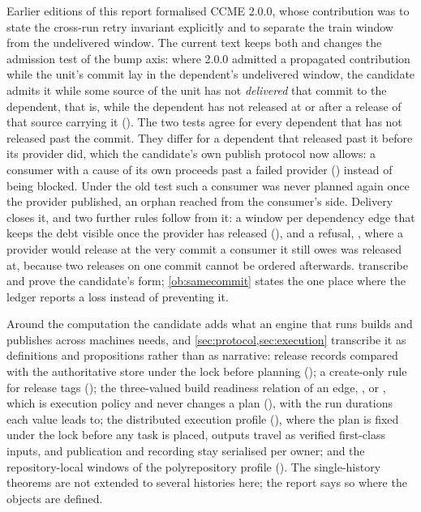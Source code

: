 Earlier editions of this report formalised CCME 2.0.0, whose contribution was
to state the cross-run retry invariant explicitly and to separate the train
window from the undelivered window. The current text keeps both and changes
the admission test of the bump axis: where 2.0.0 admitted a propagated
contribution while the unit's commit lay in the dependent's undelivered
window, the candidate admits it while some source of the unit has not
\emph{delivered} that commit to the dependent, that is, while the dependent has
not released at or after a release of that source carrying it ().
The two tests agree for every dependent that has not released past the commit.
They differ for a dependent that released past it before its provider did,
which the candidate's own publish protocol now allows: a consumer with a cause
of its own proceeds past a failed provider () instead of being
blocked. Under the old test such a consumer was never planned again once the
provider published, an orphan reached from the consumer's side. Delivery
closes it, and two further rules follow from it: a window per dependency edge
that keeps the debt visible once the provider has released (), and a
refusal, , where a provider would release at the very commit a
consumer it still owes was released at, because two releases on one commit
cannot be ordered afterwards. 
transcribe and prove the candidate's form; \cref{ob:samecommit} states the one
place where the ledger reports a loss instead of preventing it.

Around the computation the candidate adds what an engine that runs builds and
publishes across machines needs, and \cref{sec:protocol,sec:execution}
transcribe it as definitions and propositions rather than as narrative:
release records compared with the authoritative store under the lock before
planning (); a create-only rule for release tags (); the
three-valued build readiness relation of an edge, ,  or
, which is execution policy and never changes a plan
(), with the run durations each value leads to; the distributed
execution profile (), where the plan is fixed under the lock before
any task is placed, outputs travel as verified first-class inputs, and
publication and recording stay serialised per owner; and the repository-local
windows of the polyrepository profile (). The single-history theorems
are not extended to several histories here; the report says so where the
objects are defined.

